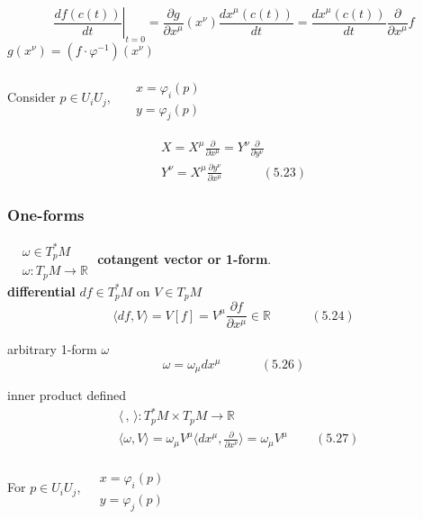 \documentclass[twoside]{amsart}
\begin{document}
\[
\left. \frac{df(c(t))}{dt}  \right|_{t=0} = \frac{ \partial g}{ \partial x^{\mu} }(x^{\nu}) \frac{dx^{\mu}(c(t)) }{ dt} = \frac{dx^{\mu}(c(t)) }{dt} \frac{ \partial}{ \partial x^{\mu} } f
\]
$g(x^{\nu}) = (f\cdot \varphi^{-1})(x^{\nu})$

Consider $p\in U_i U_j$, \, $\begin{aligned} & \quad \\
  & x = \varphi_i(p) \\ 
  & y = \varphi_j(p) \end{aligned}$ 

\[
\begin{gathered}
  X = X^{\mu} \frac{ \partial }{ \partial x^{\mu} } = Y^{\nu} \frac{ \partial }{ \partial y^{\nu}} \\ 
  Y^{\nu} = X^{\mu} \frac{ \partial y^{\nu} }{ \partial x^{\mu} } \quad \quad \quad \, (5.23)
\end{gathered}
\]



\subsubsection{One-forms}

$\begin{aligned}
  & \omega \in T_p^*M \\ 
  & \omega : T_p M \to \mathbb{R} \end{aligned}$ \quad \textbf{cotangent vector or 1-form}.  \\

\textbf{ differential } $df \in T_p^*M$ on $V \in T_pM$
\[
\langle df , V \rangle = V[f] = V^{\mu} \frac{ \partial f}{ \partial x^{\mu} } \in \mathbb{R} \quad \quad \quad \, (5.24)
\]

arbitrary 1-form $\omega$
\[
\omega = \omega_{\mu} dx^{\mu} \quad \quad \quad \, (5.26)
\]

inner product defined
\[
\begin{aligned}
  & \langle \, , \, \rangle : T_p^*M \times T_pM \to \mathbb{R} \\
  & \langle \omega, V \rangle = \omega_{\mu} V^{\mu} \langle dx^{\mu}, \frac{ \partial}{ \partial x^{\nu} } \rangle = \omega_{\mu} V^{\mu} \quad \quad \, (5.27) 
\end{aligned}
\]

For $p \in U_iU_j$, $\begin{aligned} & \quad \\ 
  & x = \varphi_i(p) \\ 
  & y = \varphi_j(p) \end{aligned}$ \\
\end{document}
